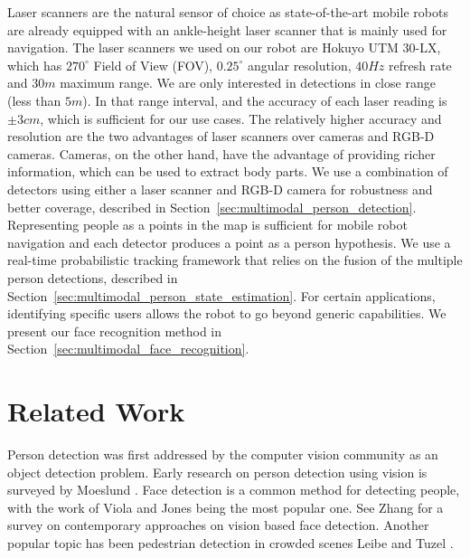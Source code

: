 Laser scanners are the natural sensor of choice as state-of-the-art mobile robots are already equipped with an ankle-height laser scanner that is mainly used for navigation. The laser scanners we used on our robot are Hokuyo UTM 30-LX, which has $270^{\circ}$ Field of View (FOV), $0.25^{\circ}$ angular resolution, $40Hz$ refresh rate and $30m$ maximum range. We are only interested in detections in close range (less than $5m$). In that range interval, and the accuracy of each laser reading is $\pm 3cm$, which is sufficient for our use cases. The relatively higher accuracy and resolution are the two advantages of laser scanners over cameras and RGB-D cameras. Cameras, on the other hand, have the advantage of providing richer information, which can be used to extract body parts. We use a combination of detectors using either a laser scanner and RGB-D camera for robustness and better coverage, described in Section~\ref{sec:multimodal_person_detection}. Representing people as a points in the map is sufficient for mobile robot navigation and each detector produces a point as a person hypothesis. We use a real-time probabilistic tracking framework that relies on the fusion of the multiple person detections, described in Section~\ref{sec:multimodal_person_state_estimation}. For certain applications, identifying specific users allows the robot to go beyond generic capabilities. We present our face recognition method in Section~\ref{sec:multimodal_face_recognition}.

\section{Related Work}
\label{sec:multimodal_related_work}

Person detection was first addressed by the computer vision community as an object detection problem. Early research on person detection using vision is surveyed by Moeslund \cite{moeslund2001}. Face detection is a common method for detecting people, with the work of Viola and Jones \cite{viola2004robust} being the most popular one. See Zhang \cite{zhang2010survey} for a survey on contemporary approaches on vision based face detection. Another popular topic has been pedestrian detection in crowded scenes Leibe \cite{leibe2005pedestrian} and Tuzel \cite{tuzel2007human}.

